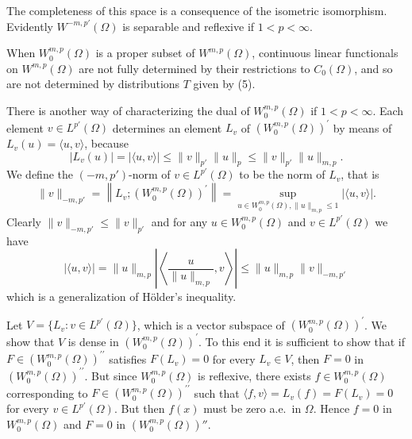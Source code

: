 The completeness of this space is a consequence of the isometric isomorphism. Evidently $W^{-m, p'}(\Omega)$ is separable and reflexive if $1<p<\infty$.

When $W_0^{m, p}(\Omega)$ is a proper subset of $W^{m,p}(\Omega)$, continuous linear functionals on $W^{m,p}(\Omega)$ are not fully determined by their restrictions to $C_0(\Omega)$, and so are not determined by distributions $T$ given by (5).


\begin{para}
  There is another way of characterizing the dual of $W_0^{m, p}(\Omega)$ if $1<p<\infty$.
  Each element $v \in L^{p'}(\Omega)$ determines an element $L_v$
  of $\left(W_0^{m, p}(\Omega)\right)^{\prime}$ by means of $L_v(u)=\langle u, v\rangle$,
  because
  \[
  \left|L_v(u)\right|=|\langle u, v\rangle| \leq\|v\|_{p'}\|u\|_p \leq\|v\|_{p'}\|u\|_{m,p} .
  \]
  We define the $\left(-m, p'\right)$-norm of $v \in L^{p'}(\Omega)$ to be the norm of $L_v$, that is
  \[
  \|v\|_{-m, p'}
    = \left\|L_v ;\left(W_0^{m, p}(\Omega)\right)^{\prime}\right\|
    = \sup_{u \in W_0^{m, p}(\Omega),\|u\|_{m,p} \leq 1}|\langle u, v\rangle| .
  \]
  Clearly $\|v\|_{-m, p'} \leq\|v\|_{p'}$ and for any $u \in W_0^{m, p}(\Omega)$ and $v \in L^{p'}(\Omega)$ we have
  \begin{equation}\label{eq:3.6}
  |\langle u, v\rangle|=\|u\|_{m,p}\left|\left\langle\frac{u}{\|u\|_{m,p}}, v\right\rangle\right| \leq\|u\|_{m,p}\|v\|_{-m, p'}
  \end{equation}
  which is a generalization of Hölder's inequality.

  Let $V = \{L_v: v \in L^{p'}(\Omega)\}$, which is a vector subspace of
  $\left(W_0^{m, p}(\Omega)\right)^{\prime}$.
  We show that $V$ is dense in $\left(W_0^{m, p}(\Omega)\right)^{\prime}$.
  To this end it is sufficient to show that if
  $F \in\left(W_0^{m, p}(\Omega)\right)^{\prime \prime}$ satisfies $F\left(L_v\right)=0$
  for every $L_v \in V$, then $F=0$ in $\left(W_0^{m, p}(\Omega)\right)^{\prime \prime}$.
  But since $W_0^{m, p}(\Omega)$ is reflexive, there exists $f \in W_0^{m, p}(\Omega)$ corresponding to $F \in\left(W_0^{m, p}(\Omega)\right)^{\prime \prime}$
  such that $\langle f, v\rangle=L_v(f)=F\left(L_v\right)=0$ for every $v \in L^{p'}(\Omega)$.
  But then $f(x)$ must be zero a.e.~in $\Omega$. Hence $f=0$ in $W_0^{m, p}(\Omega)$ and 
  $F=0$ in $(W_0^{m, p}(\Omega))''$.
  

\end{para}
